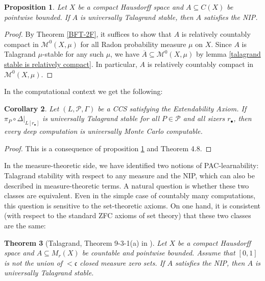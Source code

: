 \documentclass[psamsfonts]{amsart}
\newtheorem{thm}{Theorem}[section]
\newtheorem{cor}[thm]{Corollary}
\newtheorem{prop}[thm]{Proposition}
\theoremstyle{definition}
\theoremstyle{remark}
\numberwithin{equation}{section}
\begin{document}
\begin{prop}\label{prop:Talagrand implies NIP}
    Let $X$ be a compact Hausdorff space and $A\subseteq C(X)$ be pointwise bounded.
If $A$ is universally Talagrand stable, then $A$ satisfies the NIP.
\end{prop}

\begin{proof}
    By Theorem \ref{BFT-2F}, it suffices to show that $A$ is relatively countably compact in $\mathscr{M}^0(X,\mu)$ for all Radon probability measure $\mu$ on $X$.
Since $A$ is Talagrand $\mu$-stable for any such $\mu$, we have $\overline{A}\subseteq\mathscr{M}^0(X,\mu)$ by lemma \ref{talagrand stable is relatively compact}.
In particular, $A$ is relatively countably compact in $\mathscr{M}^0(X,\mu)$.
\end{proof}

In the computational context we get the following:

\begin{cor}\label{T:Talagrand stability and Monte Carlo}
    Let $(L,\mathcal{P},\Gamma)$ be a CCS satisfying the Extendability Axiom.
If $\pi_P\circ\Delta|_{L[r_\bullet]}$ is universally Talagrand stable for all $P\in\mathcal{P}$ and all sizers $r_{\bullet}$, then every deep computation is universally Monte Carlo computable.
\end{cor}

\begin{proof}
    This is a consequence of proposition \ref{prop:Talagrand implies NIP} and Theorem 4.8.
\end{proof}

In the measure-theoretic side, we have identified two notions of PAC-learnability: Talagrand stability with respect to any measure and the NIP, which can also be described in measure-theoretic terms. 
A natural question is whether these two classes are equivalent. 
Even in the simple case of countably many computations, this question is sensitive to the set-theoretic axioms. 
On one hand, it is consistent (with respect to the standard ZFC axioms of set theory) that these two classes are the same:

\begin{thm}[Talagrand, Theorem 9-3-1(a) in \cite{talagrand1984pettis}]
    Let $X$ be a compact Hausdorff space and $A\subseteq M_r(X)$ be countable and pointwise bounded.
Assume that $[0,1]$ is not the union of $<\mathfrak{c}$ closed measure zero sets.
If $A$ satisfies the NIP, then $A$ is universally Talagrand stable.
\end{thm}
\end{document}
